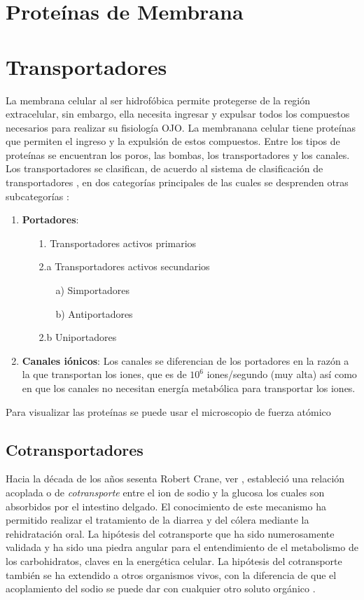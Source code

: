 \section{Prote\'{i}nas de Membrana}

\section{Transportadores}
La membrana celular al ser hidrof\'{o}bica permite protegerse de la regi\'{o}n extracelular, sin embargo, ella necesita ingresar y expulsar todos los compuestos necesarios para realizar su fisiolog\'{i}a OJO. La membranana celular tiene prote\'{i}nas que permiten el ingreso y la expulsi\'{o}n de estos compuestos. Entre los tipos de prote\'{i}nas se encuentran  los poros, las bombas, los transportadores y los canales. \\

Los transportadores se clasifican, de acuerdo al sistema de clasificaci\'{o}n de transportadores \cite{Nelson2011}, en dos categor\'{i}as principales de las cuales se desprenden otras subcategor\'{i}as :
\begin{enumerate}
 \item \textbf{Portadores}:
 \begin{enumerate}
 \item[1.] Transportadores activos primarios
 \item[2.a] Transportadores activos secundarios
  \begin{enumerate}
 \item[a)] Simportadores
 \item[b)] Antiportadores
 \end{enumerate}
 \item[2.b] Uniportadores
 \end{enumerate}
 \item  \textbf{Canales i\'{o}nicos}: Los canales se diferencian de los portadores en la raz\'{o}n a la que transportan los iones, que es de $10^6$ iones/segundo  (muy alta) as\'{i} como en que los canales no necesitan energ\'{i}a metab\'{o}lica para transportar los iones.
\end{enumerate}


Para visualizar las prote\'{i}nas se puede usar el microscopio de fuerza at\'{o}mico
\subsection{Cotransportadores}
Hacia la d\'{e}cada de los a\~{n}os sesenta Robert Crane, ver \cite{Hamilton2013}, estableci\'{o} una relaci\'{o}n acoplada o de \textit{cotransporte} entre el ion de sodio y la glucosa los cuales son absorbidos por el intestino delgado. El conocimiento de este mecanismo ha permitido realizar el tratamiento de la diarrea y del c\'{o}lera mediante la rehidrataci\'{o}n oral. La hip\'{o}tesis del cotransporte que ha sido numerosamente validada y ha sido una piedra angular para el entendimiento de el metabolismo de los carbohidratos, claves en la energ\'{e}tica celular. La hip\'{o}tesis del cotransporte tambi\'{e}n se ha extendido a otros organismos vivos, con la diferencia de que el acoplamiento del sodio se puede dar con cualquier otro soluto org\'{a}nico \cite{Faham2008}.\\
